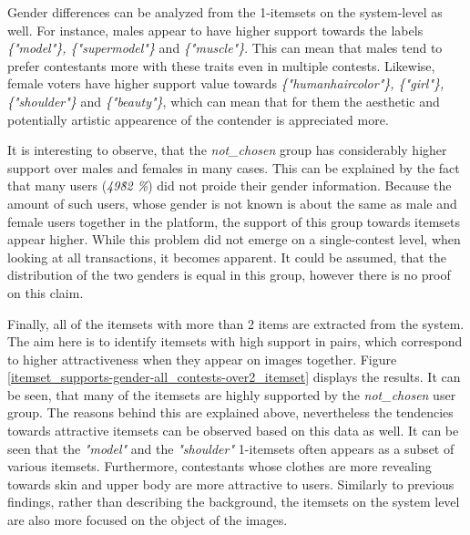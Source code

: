 Gender differences can be analyzed from the 1-itemsets on the system-level as well. For instance, males appear to have higher support towards the labels \textit{\{"model"\}, \{"supermodel"\}} and \textit{\{"muscle"\}}. This can mean that males tend to prefer contestants more with these traits even in multiple contests. Likewise, female voters have higher support value towards \textit{\{"human\:hair\:color"\}, \{"girl"\}, \{"shoulder"\}} and \textit{\{"beauty"\}}, which can mean that for them the aesthetic and potentially artistic appearence of the contender is appreciated more. 

It is interesting to observe, that the \textit{not\_chosen} group has considerably higher support over males and females in many cases. This can be explained by the fact that many users (\textit{49\.82 \%}) did not proide their gender information. Because the amount of such users, whose gender is not known is about the same as male and female users together in the platform, the support of this group towards itemsets appear higher. While this problem did not emerge on a single-contest level, when looking at all transactions, it becomes apparent. It could be assumed, that the distribution of the two genders is equal in this group, however there is no proof on this claim. 

Finally, all of the itemsets with more than 2 items are extracted from the system. The aim here is to identify itemsets with high support in pairs, which correspond to higher attractiveness when they appear on images together. Figure \ref{itemset_supports-gender-all_contests-over2_itemset} displays the results. It can be seen, that many of the itemsets are highly supported by the \textit{not\_chosen} user group. The reasons behind this are explained above, nevertheless the tendencies towards attractive itemsets can be observed based on this data as well. It can be seen that the \textit{"{model}"} and the \textit{"{shoulder}"} 1-itemsets often appears as a subset of various itemsets. Furthermore, contestants whose clothes are more revealing towards skin and upper body are more attractive to users. Similarly to previous findings, rather than describing the background, the itemsets on the system level are also more focused on the object of the images. 

